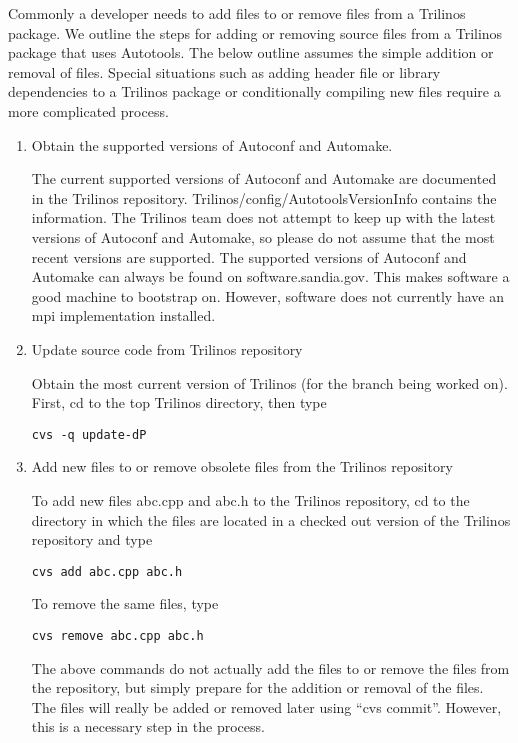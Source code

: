 \documentclass[12pt,relax]{SANDreport}
\begin{document}
Commonly a developer needs to add files to or remove files from a Trilinos 
package.  We outline the steps for adding or removing source files from a 
Trilinos package that uses Autotools.  The below outline assumes the simple 
addition or removal of files.  Special situations such as adding header file 
or library dependencies to a Trilinos package or conditionally compiling new 
files require a more complicated process.
\begin{enumerate}
\item Obtain the supported versions of Autoconf and Automake.

The current supported versions of Autoconf and Automake are documented in 
the Trilinos repository.  Trilinos/config/AutotoolsVersionInfo contains the 
information.  The Trilinos team does not attempt to keep up with the latest 
versions of Autoconf and Automake, so please do not assume that the most 
recent versions are supported.  The supported versions of Autoconf and 
Automake can always be found on software.sandia.gov.  This makes software a 
good machine to bootstrap on.  However, software does not currently have an
mpi implementation installed.

\item Update source code from Trilinos repository

Obtain the most current version of Trilinos (for the branch being worked on).  
First, cd to the top Trilinos directory, then type
\begin{verbatim}
cvs -q update-dP
\end{verbatim}

\item Add new files to or remove obsolete files from the Trilinos repository

To add new files abc.cpp and abc.h to the Trilinos repository, cd to the 
directory in which the files are located in a checked out version of the 
Trilinos repository and type
\begin{verbatim}
cvs add abc.cpp abc.h
\end{verbatim}
To remove the same files, type
\begin{verbatim}
cvs remove abc.cpp abc.h
\end{verbatim}
The above commands do not actually add the files to or remove the files 
from the repository, but simply prepare for the addition or removal of the 
files.  The files will really be added or removed later using ``cvs commit''.  
However, this is a necessary step in the process.


\end{enumerate}
\end{document}
